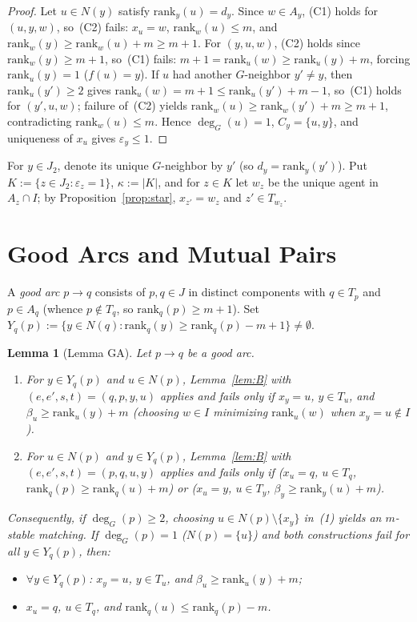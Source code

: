 \documentclass[11pt]{article}
\newtheorem{lemma}[theorem]{Lemma}
\begin{document}
\begin{proof}
Let $u \in N(y)$ satisfy $\mathrm{rank}_y(u) = d_y$. Since $w \in A_y$, (C1) holds for $(u,y,w)$, so~(C2) fails: $x_u = w$, $\mathrm{rank}_w(u) \le m$, and $\mathrm{rank}_w(y) \ge \mathrm{rank}_w(u) + m \ge m+1$. For $(y,u,w)$, (C2) holds since $\mathrm{rank}_w(y) \ge m+1$, so~(C1) fails: $m+1 = \mathrm{rank}_u(w) \ge \mathrm{rank}_u(y) + m$, forcing $\mathrm{rank}_u(y) = 1$ ($f(u) = y$). If $u$ had another $G$-neighbor $y' \neq y$, then $\mathrm{rank}_u(y') \ge 2$ gives $\mathrm{rank}_u(w) = m+1 \le \mathrm{rank}_u(y') + m - 1$, so~(C1) holds for $(y',u,w)$; failure of~(C2) yields $\mathrm{rank}_w(u) \ge \mathrm{rank}_w(y') + m \ge m+1$, contradicting $\mathrm{rank}_w(u) \le m$. Hence $\deg_G(u) = 1$, $C_y = \{u,y\}$, and uniqueness of $x_u$ gives $\varepsilon_y \le 1$.
\end{proof}

For $y \in J_2$, denote its unique $G$-neighbor by $y'$ (so $d_y = \mathrm{rank}_y(y')$). Put $K := \{z \in J_2 : \varepsilon_z = 1\}$, $\kappa := |K|$, and for $z \in K$ let $w_z$ be the unique agent in $A_z \cap I$; by Proposition~\ref{prop:star}, $x_{z'} = w_z$ and $z' \in T_{w_z}$.

\section{Good Arcs and Mutual Pairs}

A \emph{good arc} $p \to q$ consists of $p, q \in J$ in distinct components with $q \in T_p$ and $p \in A_q$ (whence $p \notin T_q$, so $\mathrm{rank}_q(p) \ge m+1$). Set $Y_q(p) := \{y \in N(q) : \mathrm{rank}_q(y) \ge \mathrm{rank}_q(p) - m + 1\} \neq \emptyset$.

\begin{lemma}[Lemma GA]\label{lem:GA}
Let $p \to q$ be a good arc.
\begin{enumerate}
  \item For $y \in Y_q(p)$ and $u \in N(p)$, Lemma~\ref{lem:B} with $(e,e',s,t) = (q,p,y,u)$ applies and fails only if $x_y = u$, $y \in T_u$, and $\beta_u \ge \mathrm{rank}_u(y) + m$ (choosing $w \in I$ minimizing $\mathrm{rank}_u(w)$ when $x_y = u \notin I$).
  \item For $u \in N(p)$ and $y \in Y_q(p)$, Lemma~\ref{lem:B} with $(e,e',s,t) = (p,q,u,y)$ applies and fails only if ($x_u = q$, $u \in T_q$, $\mathrm{rank}_q(p) \ge \mathrm{rank}_q(u)+m$) or ($x_u = y$, $u \in T_y$, $\beta_y \ge \mathrm{rank}_y(u)+m$).
\end{enumerate}
Consequently, if $\deg_G(p) \ge 2$, choosing $u \in N(p) \setminus \{x_y\}$ in~(1) yields an $m$-stable matching. If $\deg_G(p) = 1$ ($N(p) = \{u\}$) and both constructions fail for all $y \in Y_q(p)$, then:
\begin{itemize}
  \item[\emph{(G1)}] $\forall y \in Y_q(p)$: $x_y = u$, $y \in T_u$, and $\beta_u \ge \mathrm{rank}_u(y) + m$;
  \item[\emph{(G2)}] $x_u = q$, $u \in T_q$, and $\mathrm{rank}_q(u) \le \mathrm{rank}_q(p) - m$.
\end{itemize}
\end{lemma}
\end{document}
